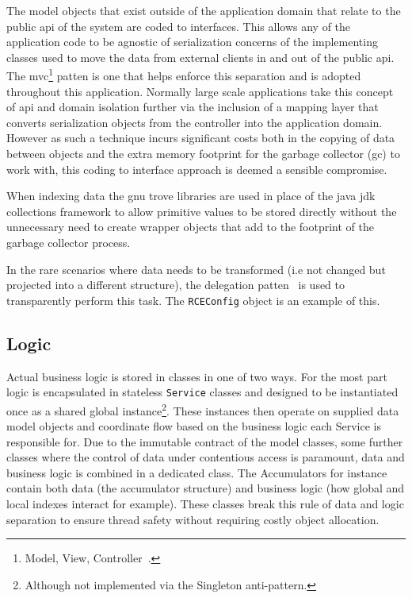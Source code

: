 \documentclass[a4paper,11pt]{scrreprt}
\begin{document}
The model objects that exist outside of the application domain that relate to the public \acrshort{api} of the system are coded to interfaces. This allows any of the application code to be agnostic of serialization concerns of the implementing classes used to move the data from external clients in and out of the public \acrshort{api}. The \acrshort{mvc}\footnote{Model, View, Controller~\cite{mvc}.} patten is one that helps enforce this separation and is adopted throughout this application. Normally large scale applications take this concept of \acrshort{api} and domain isolation further via the inclusion of a mapping layer that converts serialization objects from the controller into the application domain. However as such a technique incurs significant costs both in the copying of data between objects and the extra memory footprint for the garbage collector (\acrshort{gc}) to work with, this coding to interface approach is deemed a sensible compromise. 

When indexing data the gnu trove libraries are used in place of the java \acrshort{jdk} collections framework to allow primitive values to be stored directly without the unnecessary need to create wrapper objects that add to the footprint of the garbage collector process.

In the rare scenarios where data needs to be transformed (i.e not changed but projected into a different structure), the delegation patten~\cite{design-patterns} is used to transparently perform this task. The \verb|RCEConfig| object is an example of this.
\subsection{Logic}
Actual business logic is stored in classes in one of two ways. For the most part logic is encapsulated in stateless \verb|Service| classes and designed to be instantiated once as a shared global instance\footnote{Although not implemented via the Singleton anti-pattern.}. These instances then operate on supplied data model objects and coordinate flow based on the business logic each Service is responsible for. Due to the immutable contract of the model classes, some further classes where the control of data under contentious access is paramount, data and business logic is combined in a dedicated class. The Accumulators for instance contain both data (the accumulator structure) and business logic (how global and local indexes interact for example). These classes break this rule of data and logic separation to ensure thread safety without requiring costly object allocation. 
\end{document}
